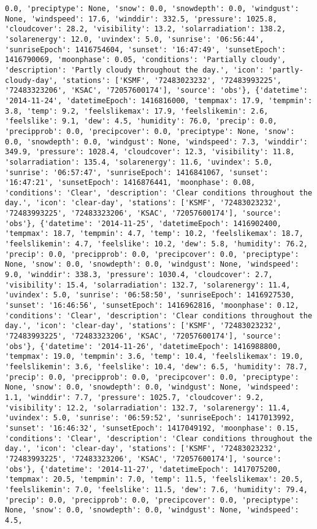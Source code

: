 \documentclass[
  letterpaper,
  DIV=11,
  numbers=noendperiod]{scrartcl}
\begin{document}
\begin{verbatim}
0.0, 'preciptype': None, 'snow': 0.0, 'snowdepth': 0.0, 'windgust': None, 'windspeed': 17.6, 'winddir': 332.5, 'pressure': 1025.8, 'cloudcover': 28.2, 'visibility': 13.2, 'solarradiation': 138.2, 'solarenergy': 12.0, 'uvindex': 5.0, 'sunrise': '06:56:44', 'sunriseEpoch': 1416754604, 'sunset': '16:47:49', 'sunsetEpoch': 1416790069, 'moonphase': 0.05, 'conditions': 'Partially cloudy', 'description': 'Partly cloudy throughout the day.', 'icon': 'partly-cloudy-day', 'stations': ['KSMF', '72483023232', '72483993225', '72483323206', 'KSAC', '72057600174'], 'source': 'obs'}, {'datetime': '2014-11-24', 'datetimeEpoch': 1416816000, 'tempmax': 17.9, 'tempmin': 3.8, 'temp': 9.2, 'feelslikemax': 17.9, 'feelslikemin': 2.6, 'feelslike': 9.1, 'dew': 4.5, 'humidity': 76.0, 'precip': 0.0, 'precipprob': 0.0, 'precipcover': 0.0, 'preciptype': None, 'snow': 0.0, 'snowdepth': 0.0, 'windgust': None, 'windspeed': 7.3, 'winddir': 349.9, 'pressure': 1028.4, 'cloudcover': 12.3, 'visibility': 11.8, 'solarradiation': 135.4, 'solarenergy': 11.6, 'uvindex': 5.0, 'sunrise': '06:57:47', 'sunriseEpoch': 1416841067, 'sunset': '16:47:21', 'sunsetEpoch': 1416876441, 'moonphase': 0.08, 'conditions': 'Clear', 'description': 'Clear conditions throughout the day.', 'icon': 'clear-day', 'stations': ['KSMF', '72483023232', '72483993225', '72483323206', 'KSAC', '72057600174'], 'source': 'obs'}, {'datetime': '2014-11-25', 'datetimeEpoch': 1416902400, 'tempmax': 18.7, 'tempmin': 4.7, 'temp': 10.2, 'feelslikemax': 18.7, 'feelslikemin': 4.7, 'feelslike': 10.2, 'dew': 5.8, 'humidity': 76.2, 'precip': 0.0, 'precipprob': 0.0, 'precipcover': 0.0, 'preciptype': None, 'snow': 0.0, 'snowdepth': 0.0, 'windgust': None, 'windspeed': 9.0, 'winddir': 338.3, 'pressure': 1030.4, 'cloudcover': 2.7, 'visibility': 15.4, 'solarradiation': 132.7, 'solarenergy': 11.4, 'uvindex': 5.0, 'sunrise': '06:58:50', 'sunriseEpoch': 1416927530, 'sunset': '16:46:56', 'sunsetEpoch': 1416962816, 'moonphase': 0.12, 'conditions': 'Clear', 'description': 'Clear conditions throughout the day.', 'icon': 'clear-day', 'stations': ['KSMF', '72483023232', '72483993225', '72483323206', 'KSAC', '72057600174'], 'source': 'obs'}, {'datetime': '2014-11-26', 'datetimeEpoch': 1416988800, 'tempmax': 19.0, 'tempmin': 3.6, 'temp': 10.4, 'feelslikemax': 19.0, 'feelslikemin': 3.6, 'feelslike': 10.4, 'dew': 6.5, 'humidity': 78.7, 'precip': 0.0, 'precipprob': 0.0, 'precipcover': 0.0, 'preciptype': None, 'snow': 0.0, 'snowdepth': 0.0, 'windgust': None, 'windspeed': 1.1, 'winddir': 7.7, 'pressure': 1025.7, 'cloudcover': 9.2, 'visibility': 12.2, 'solarradiation': 132.7, 'solarenergy': 11.4, 'uvindex': 5.0, 'sunrise': '06:59:52', 'sunriseEpoch': 1417013992, 'sunset': '16:46:32', 'sunsetEpoch': 1417049192, 'moonphase': 0.15, 'conditions': 'Clear', 'description': 'Clear conditions throughout the day.', 'icon': 'clear-day', 'stations': ['KSMF', '72483023232', '72483993225', '72483323206', 'KSAC', '72057600174'], 'source': 'obs'}, {'datetime': '2014-11-27', 'datetimeEpoch': 1417075200, 'tempmax': 20.5, 'tempmin': 7.0, 'temp': 11.5, 'feelslikemax': 20.5, 'feelslikemin': 7.0, 'feelslike': 11.5, 'dew': 7.6, 'humidity': 79.4, 'precip': 0.0, 'precipprob': 0.0, 'precipcover': 0.0, 'preciptype': None, 'snow': 0.0, 'snowdepth': 0.0, 'windgust': None, 'windspeed': 4.5, 
\end{verbatim}
\end{document}
